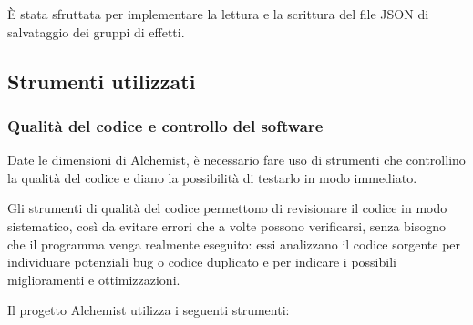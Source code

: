                 È stata sfruttata per implementare la lettura e la scrittura del file JSON di salvataggio dei gruppi di effetti.

        \subsection{Strumenti utilizzati}\label{subsec:strum}
            \subsubsection{Qualità del codice e controllo del software}\label{subsubsec:codeQuality}
                Date le dimensioni di Alchemist, è necessario fare uso di strumenti che controllino la qualità del codice e diano la possibilità di testarlo in modo immediato.

                Gli strumenti di qualità del codice permettono di revisionare il codice in modo sistematico, così da evitare errori che a volte possono verificarsi, senza bisogno che il programma venga realmente eseguito:
                essi analizzano il codice sorgente per individuare potenziali bug o codice duplicato e per indicare i possibili miglioramenti e ottimizzazioni.

                Il progetto Alchemist utilizza i seguenti strumenti:

